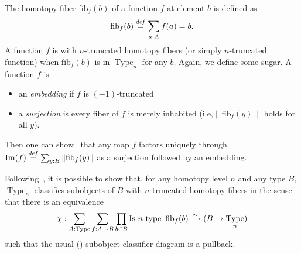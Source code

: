 \documentclass[preprint,9pt,numbers]{sigplanconf}
\newcommand \defeq {\overset{de\hspace{-0.2ex}f}{=}}
\newcommand{\ie}{i.e,\xspace}
\DeclareMathOperator{\Type}{Type}
\DeclareMathOperator{\im}{Im}
\def\mymathhyphen{{\hbox{-}}}
\newcommand{\IsType}[1]
{\mathop{\mathrm{Is\mymathhyphen}#1\mathrm{\mymathhyphen type}} }
\newcommand \fib[2] {\mathrm{fib}_{#1}(#2)}
\newenvironment{mymath}[1][-0em]{%
  \newcommand\mymathaux{\vspace{#1}}%
  \vspace{#1}%
  \begin{equation*}%
  }{ %
    \mymathaux%
  \end{equation*}}
\begin{document}
%
The homotopy fiber $\fib{f}{b}$ of a function $f$ at element $b$ is
defined as 
\begin{mymath}[-0.3em]
\fib{f}{b} \defeq \sum_{a:A} f(a) = b.
\end{mymath}%
%
A function $f$ is with $n$-truncated homotopy fibers (or simply
$n$-truncated function) when $\fib{f}{b}$
is in $\Type_n$ for any $b$.  
%
Again, we define some sugar. A function $f$ is 
\begin{itemize}
\item an {\em embedding} if $f$ is $(-1)$-truncated
\item a {\em surjection} is every fiber of $f$ is merely inhabited
  (\ie $\|\fib f y\|$ holds for all $y$).
\end{itemize}
Then one can show~\cite[Lemma 7.6.4]{hottbook} that any map $f$
factors uniquely through $\im(f) \defeq \sum_{y:B} \|\fib f y\|$ as a
surjection followed by an embedding.

Following~\cite{sets_in_hott}, it is possible to show that, for any
homotopy level $n$ and any type $B$, $\Type_n$ classifies subobjects
of $B$ with $n$-truncated homotopy fibers in the sense that there is
an equivalence
%
\begin{mymath}[0em]
  \chi : \sum_{A:\Type} \sum_{f:A \to B} \prod_{b\in B}
\IsType n\
\fib{f}{b} \xrightarrow{\sim} 
 (B \to \Type_n)
\end{mymath}%
%
 such that the usual (\cite[Theorem 4.8.4]{hottbook}) subobject classifier diagram is a pullback.


\end{document}
